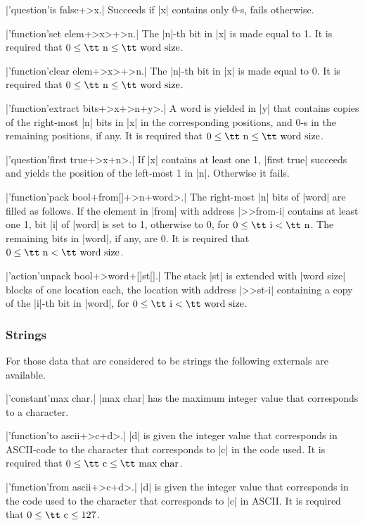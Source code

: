 \documentclass{article}
\begin{document}
\X\pp|'question'is false+>x.|\Y
Succeeds if \pp|x| contains only 0-s, fails otherwise.

\X\pp|'function'set elem+>x>+>n.|\Y
The \pp|n|-th bit in \pp|x| is made equal to 1. It is required that
$0\le\mbox{\tt n}\le\mbox{\tt word size}$.

\X\pp|'function'clear elem+>x>+>n.|\Y
The \pp|n|-th bit in \pp|x| is made equal to 0. It is required that
$0\le\mbox{\tt n}\le\mbox{\tt word size}$.

\X\pp|'function'extract bits+>x+>n+y>.|\Y
A word is yielded in \pp|y| that contains copies of the right-most \pp|n|
bits in \pp|x| in the corresponding positions, and 0-s in the remaining
positions, if any. It is required that $0\le\mbox{\tt n}\le\mbox{\tt word
size}$.

\X\pp|'question'first true+>x+n>.|\Y
If \pp|x| contains at least one 1, \pp|first true| succeeds and yields the
position of the left-most 1 in \pp|n|. Otherwise it fails.

\smallskip
\X\pp|'function'pack bool+from[]+>n+word>.|\Y
The right-most \pp|n| bits of \pp|word| are filled as follows. If the
element in \pp|from| with address \pp|>>from-i| contains at least one 1, bit
\pp|i| of \pp|word| is set to 1, otherwise to 0, for $0\le\mbox{\tt
i}<\mbox{\tt n}$. The remaining bits in \pp|word|, if any, are 0. It is
required that $0\le\mbox{\tt n}<\mbox{\tt word size}$.

\X\pp|'action'unpack bool+>word+[]st[].|\Y
The stack \pp|st| is extended with \pp|word size| blocks of one location
each, the location with address \pp|>>st-i| containing a copy of the
\pp|i|-th bit in \pp|word|, for $0\le\mbox{\tt i}<\mbox{\tt word size}$.

\subsubsection{Strings}\label{5.2.3}

For those data that are considered to be strings the
following externals are available.

\X\pp|'constant'max char.|\Y
\pp|max char| has the maximum integer value that corresponds to a character.

\X\pp|'function'to ascii+>c+d>.|\Y
\pp|d| is given the integer value that corresponds in ASCII-code to the
character that corresponds to \pp|c| in the code used. It is required that
$0\le\mbox{\tt c}\le\mbox{\tt max char}$.

\X\pp|'function'from ascii+>c+d>.|\Y
\pp|d| is given the integer value that corresponds in the code used to the
character that corresponds to \pp|c| in ASCII. It is required that
$0\le\mbox{\tt c}\le 127$.
\end{document}
